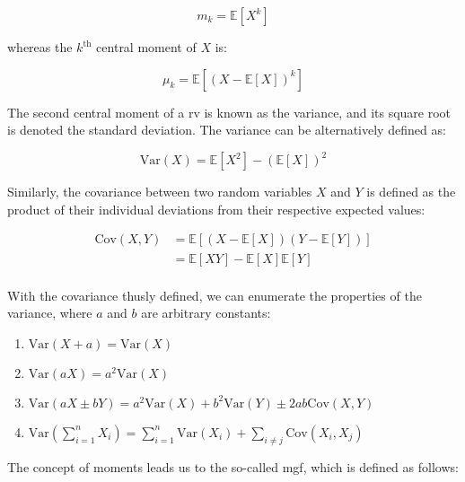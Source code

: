 \documentclass{report}
\begin{document}
\begin{equation}\label{eq:raw-moment}
    m_k = \mathbb{E}\left[X^k\right]
\end{equation}

whereas the $k^{\text{th}}$ central moment of $X$ is:

\begin{equation}\label{eq:central-moment}
    \mu_k = \mathbb{E}\left[(X - \mathbb{E}[X])^k\right]
\end{equation}

The second central moment of a \gls{rv} is known as the variance, and its square root is denoted the standard deviation. The variance can be alternatively defined as:

\begin{equation}\label{eq:variance}
    \text{Var}(X) = \mathbb{E}\left[X^2\right] - \left(\mathbb{E}[X]\right)^2
\end{equation}

Similarly, the covariance between two random variables $X$ and $Y$ is defined as the product of their individual deviations from their respective expected values: 

\begin{equation}
    \begin{aligned}
        \text{Cov}(X, Y) 
          &= \mathbb{E}\left[(X - \mathbb{E}[X])(Y - \mathbb{E}[Y])\right] \\
          &= \mathbb{E}[XY] - \mathbb{E}[X]\mathbb{E}[Y] \\
    \end{aligned}
\end{equation}

With the covariance thusly defined, we can enumerate the properties of the variance, where $a$ and $b$ are arbitrary constants:

\begin{enumerate}
    \item $\text{Var}(X + a) = \text{Var}(X)$
    \item $\text{Var}(aX) = a^2\text{Var}(X)$
    \item $\text{Var}(aX \pm bY) = a^2\text{Var}(X) + b^2\text{Var}(Y) \pm 2ab\text{Cov}(X, Y)$
    \item $\text{Var}\left(\sum_{i=1}^n X_i\right) = \sum_{i=1}^n \text{Var}(X_i) + \sum_{i\neq j} \text{Cov}(X_i, X_j)$
\end{enumerate}

The concept of moments leads us to the so-called \gls{mgf}, which is defined as follows:
\end{document}
